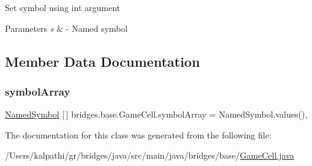 Set symbol using int argument 
\begin{DoxyParams}{Parameters}
{\em s} & -\/ Named symbol \\
\hline
\end{DoxyParams}


\subsection{Member Data Documentation}
\mbox{\label{classbridges_1_1base_1_1_game_cell_a558b0696aebc6676780316714bf60e0d}} 
\subsubsection{\texorpdfstring{symbolArray}{symbolArray}}
{\footnotesize\ttfamily \mbox{\hyperlink{enumbridges_1_1base_1_1_named_symbol}{Named\+Symbol}} \mbox{[}$\,$\mbox{]} bridges.\+base.\+Game\+Cell.\+symbol\+Array = Named\+Symbol.\+values()\hspace{0.3cm}{\ttfamily [static]}, {\ttfamily [protected]}}



The documentation for this class was generated from the following file\+:\begin{DoxyCompactItemize}
\item 
/\+Users/kalpathi/gr/bridges/java/src/main/java/bridges/base/\mbox{\hyperlink{_game_cell_8java}{Game\+Cell.\+java}}\end{DoxyCompactItemize}

